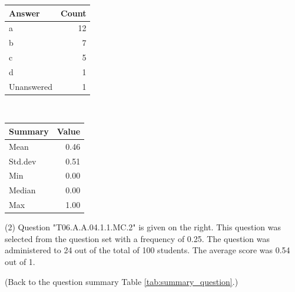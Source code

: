 \documentclass[12pt,nohyper]{tufte-handout}\usepackage[]{graphicx}\usepackage[]{color}
\begin{document}
\begin{center}%
\begin{tabular}{lr}
  \hline
Answer & Count \\ 
  \hline
a &  12 \\ 
  b &   7 \\ 
  c &   5 \\ 
  d &   1 \\ 
  Unanswered &   1 \\ 
   \hline
\end{tabular}
~~~~~~~~%
\begin{tabular}{lr}
  \hline
Summary & Value \\ 
  \hline
Mean & 0.46 \\ 
  Std.dev & 0.51 \\ 
  Min & 0.00 \\ 
  Median & 0.00 \\ 
  Max & 1.00 \\ 
   \hline
\end{tabular}
\end{center}\newpage{} (2) Question "T06.A.A.04.1.1.MC.2" is given on the right. This question was selected from the question set with a frequency of 0.25. The question was administered to 24 out of the total of 100 students. The average score was 0.54 out of 1.

 (Back to the question summary Table \ref{tab:summary_question}.)
\end{document}
